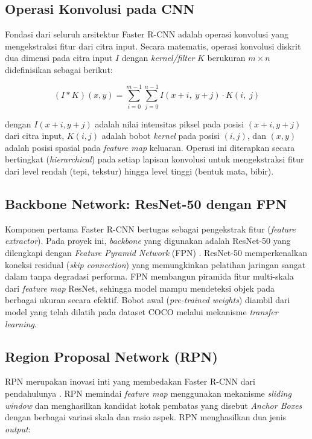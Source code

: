 \documentclass[11pt,a4paper,oneside]{report}
\begin{document}
\subsection{Operasi Konvolusi pada CNN}

Fondasi dari seluruh arsitektur Faster R-CNN adalah operasi konvolusi yang mengekstraksi fitur dari citra input. Secara matematis, operasi konvolusi diskrit dua dimensi pada citra input $I$ dengan \textit{kernel/filter} $K$ berukuran $m \times n$ didefinisikan sebagai berikut:

\begin{equation}
\label{eq:konvolusi}
(I * K)(x, y) = \sum_{i=0}^{m-1} \sum_{j=0}^{n-1} I(x+i,\; y+j) \cdot K(i,\; j)
\end{equation}

\noindent dengan $I(x+i, y+j)$ adalah nilai intensitas piksel pada posisi $(x+i, y+j)$ dari citra input, $K(i,j)$ adalah bobot \textit{kernel} pada posisi $(i,j)$, dan $(x,y)$ adalah posisi spasial pada \textit{feature map} keluaran. Operasi ini diterapkan secara bertingkat (\textit{hierarchical}) pada setiap lapisan konvolusi untuk mengekstraksi fitur dari level rendah (tepi, tekstur) hingga level tinggi (bentuk mata, bibir).

\subsection{Backbone Network: ResNet-50 dengan FPN}

Komponen pertama Faster R-CNN bertugas sebagai pengekstrak fitur (\textit{feature extractor}). Pada proyek ini, \textit{backbone} yang digunakan adalah ResNet-50 \cite{he2016deep} yang dilengkapi dengan \textit{Feature Pyramid Network} (FPN) \cite{lin2017feature}. ResNet-50 memperkenalkan koneksi residual (\textit{skip connection}) yang memungkinkan pelatihan jaringan sangat dalam tanpa degradasi performa. FPN membangun piramida fitur multi-skala dari \textit{feature map} ResNet, sehingga model mampu mendeteksi objek pada berbagai ukuran secara efektif. Bobot awal (\textit{pre-trained weights}) diambil dari model yang telah dilatih pada dataset COCO \cite{lin2014coco} melalui mekanisme \textit{transfer learning}.

\subsection{Region Proposal Network (RPN)}

RPN merupakan inovasi inti yang membedakan Faster R-CNN dari pendahulunya \cite{girshick2015fast}. RPN memindai \textit{feature map} menggunakan mekanisme \textit{sliding window} dan menghasilkan kandidat kotak pembatas yang disebut \textit{Anchor Boxes} dengan berbagai variasi skala dan rasio aspek. RPN menghasilkan dua jenis \textit{output}:
\end{document}
